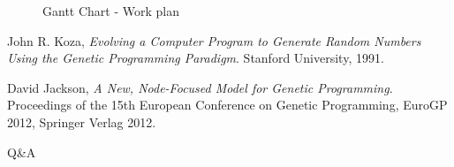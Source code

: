 \documentclass{beamer}
\begin{document}
\begin{frame}
\begin{figure}
{\begin{ganttchart}

\end{ganttchart}}
\caption{Gantt Chart - Work plan}
\label{fig:ganttchart}
\end{figure}

\end{frame}



\begin{thebibliography}{2}
  John R. Koza, 
  \emph{Evolving a Computer Program to Generate Random Numbers Using the Genetic Programming Paradigm}. 
  Stanford University, 
  1991.

  David Jackson,
  \emph{A New, Node-Focused Model for Genetic Programming}.
  Proceedings of the 15th European Conference on Genetic Programming, EuroGP 2012, 
  Springer Verlag
  2012.
\end{thebibliography}

\begin{frame}
\begin{center}Q\&A\end{center}
\end{frame}
\end{document}
